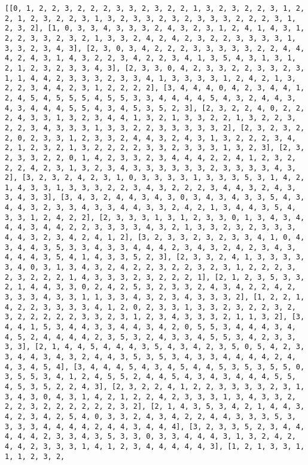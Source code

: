 \documentclass[11pt]{article}
\begin{document}
    \begin{Verbatim}[commandchars=\\\{\}]
[[0, 1, 2, 2, 3, 2, 2, 2, 3, 3, 2, 3, 2, 2, 1, 3, 2, 3, 2, 2, 3, 1, 2, 2, 1, 2, 3, 2, 2, 3, 1, 3, 2, 3, 3, 2, 3, 2, 3, 3, 3, 2, 2, 2, 3, 1, 2, 3, 2], [1, 0, 3, 3, 4, 3, 3, 3, 2, 4, 3, 2, 3, 1, 2, 4, 1, 4, 3, 1, 2, 2, 3, 3, 2, 3, 2, 1, 3, 3, 2, 4, 2, 4, 2, 3, 2, 2, 3, 3, 3, 3, 1, 3, 3, 2, 3, 4, 3], [2, 3, 0, 3, 4, 2, 2, 2, 3, 3, 3, 3, 3, 2, 2, 4, 4, 4, 2, 4, 3, 1, 4, 3, 2, 2, 3, 4, 2, 2, 3, 4, 1, 3, 5, 4, 3, 1, 3, 1, 2, 1, 2, 3, 2, 3, 3, 4, 3], [2, 3, 3, 0, 4, 2, 3, 3, 2, 2, 3, 3, 2, 3, 1, 1, 4, 4, 2, 3, 3, 3, 2, 3, 3, 4, 1, 3, 3, 3, 3, 1, 2, 4, 2, 1, 3, 2, 2, 3, 4, 4, 2, 3, 1, 2, 2, 2, 2], [3, 4, 4, 4, 0, 4, 2, 3, 4, 4, 1, 2, 4, 5, 4, 5, 5, 5, 4, 5, 5, 3, 3, 4, 4, 4, 4, 5, 4, 3, 2, 4, 4, 3, 4, 3, 4, 4, 4, 5, 5, 4, 3, 4, 5, 3, 5, 2, 3], [2, 3, 2, 2, 4, 0, 2, 2, 2, 4, 3, 3, 1, 3, 2, 3, 4, 4, 1, 3, 2, 1, 3, 3, 2, 2, 1, 3, 2, 2, 3, 2, 2, 3, 4, 3, 3, 3, 1, 3, 3, 2, 2, 3, 3, 3, 3, 3, 2], [2, 3, 2, 3, 2, 2, 0, 2, 3, 3, 1, 2, 3, 3, 2, 4, 4, 3, 2, 4, 3, 1, 3, 2, 2, 2, 3, 4, 2, 1, 2, 3, 2, 1, 3, 2, 2, 2, 2, 3, 3, 2, 3, 3, 3, 1, 3, 2, 3], [2, 3, 2, 3, 3, 2, 2, 0, 1, 4, 2, 3, 3, 2, 3, 4, 4, 4, 2, 2, 4, 1, 2, 3, 2, 2, 2, 4, 2, 3, 1, 3, 2, 3, 4, 3, 3, 3, 3, 3, 3, 2, 3, 3, 3, 3, 4, 3, 2], [3, 2, 3, 2, 4, 2, 3, 1, 0, 3, 3, 3, 3, 1, 3, 3, 3, 5, 3, 1, 4, 2, 1, 4, 3, 3, 1, 3, 3, 3, 2, 2, 3, 4, 3, 2, 2, 2, 3, 4, 4, 3, 2, 4, 3, 3, 4, 3, 3], [3, 4, 3, 2, 4, 4, 3, 4, 3, 0, 3, 4, 3, 4, 3, 3, 5, 4, 3, 4, 4, 3, 2, 3, 3, 4, 3, 3, 4, 4, 3, 3, 2, 4, 2, 1, 3, 4, 4, 3, 5, 4, 3, 3, 1, 2, 4, 2, 2], [2, 3, 3, 3, 1, 3, 1, 2, 3, 3, 0, 1, 3, 4, 3, 4, 4, 4, 3, 4, 4, 2, 2, 3, 3, 3, 3, 4, 3, 2, 1, 3, 3, 2, 3, 2, 3, 3, 3, 4, 4, 3, 2, 3, 4, 2, 4, 1, 2], [3, 2, 3, 3, 2, 3, 2, 3, 3, 4, 1, 0, 4, 3, 4, 4, 3, 5, 3, 3, 4, 3, 3, 4, 4, 4, 2, 3, 4, 3, 2, 4, 2, 3, 4, 3, 4, 4, 4, 3, 5, 4, 1, 4, 3, 3, 5, 2, 3], [2, 3, 3, 2, 4, 1, 3, 3, 3, 3, 3, 4, 0, 3, 1, 3, 4, 3, 2, 4, 2, 2, 3, 2, 2, 3, 2, 3, 1, 2, 2, 2, 3, 2, 3, 2, 2, 2, 1, 4, 3, 3, 3, 2, 3, 2, 2, 2, 1], [2, 1, 2, 3, 5, 3, 3, 2, 1, 4, 4, 3, 3, 0, 2, 4, 2, 5, 3, 2, 3, 3, 2, 4, 3, 4, 2, 2, 4, 2, 3, 3, 3, 4, 3, 3, 1, 1, 3, 3, 4, 3, 2, 3, 4, 3, 3, 3, 2], [1, 2, 2, 1, 4, 2, 2, 3, 3, 3, 3, 4, 1, 2, 0, 2, 3, 3, 1, 3, 3, 2, 3, 2, 2, 3, 2, 3, 2, 2, 2, 2, 2, 3, 3, 2, 3, 1, 2, 3, 4, 3, 3, 3, 2, 1, 1, 3, 2], [3, 4, 4, 1, 5, 3, 4, 4, 3, 3, 4, 4, 3, 4, 2, 0, 5, 5, 3, 4, 4, 4, 3, 4, 4, 5, 2, 4, 4, 4, 4, 2, 3, 5, 3, 2, 4, 3, 3, 4, 5, 5, 3, 4, 2, 3, 3, 3, 3], [2, 1, 4, 4, 5, 4, 4, 4, 3, 5, 4, 3, 4, 2, 3, 5, 0, 5, 4, 2, 3, 3, 4, 4, 3, 4, 3, 2, 4, 4, 3, 5, 3, 5, 3, 4, 3, 3, 4, 4, 4, 4, 2, 4, 4, 3, 4, 5, 4], [3, 4, 4, 4, 5, 4, 3, 4, 5, 4, 4, 5, 3, 5, 3, 5, 5, 0, 3, 5, 5, 3, 4, 1, 2, 4, 5, 5, 2, 4, 4, 5, 4, 3, 4, 3, 4, 4, 4, 5, 5, 4, 5, 3, 5, 2, 2, 4, 3], [2, 3, 2, 2, 4, 1, 2, 2, 3, 3, 3, 3, 2, 3, 1, 3, 4, 3, 0, 4, 3, 1, 4, 2, 1, 2, 2, 4, 2, 3, 3, 3, 1, 3, 4, 3, 3, 2, 2, 2, 3, 2, 2, 2, 2, 2, 2, 3, 2], [2, 1, 4, 3, 5, 3, 4, 2, 1, 4, 4, 3, 4, 2, 3, 4, 2, 5, 4, 0, 3, 3, 2, 4, 3, 4, 2, 2, 4, 4, 3, 3, 3, 5, 3, 3, 3, 3, 4, 4, 4, 4, 2, 4, 4, 3, 4, 4, 4], [3, 2, 3, 3, 5, 2, 3, 4, 4, 4, 4, 4, 2, 3, 3, 4, 3, 5, 3, 3, 0, 3, 3, 4, 4, 4, 3, 1, 3, 2, 4, 2, 4, 4, 2, 3, 3, 3, 1, 4, 1, 2, 3, 4, 4, 4, 4, 4, 3], [1, 2, 1, 3, 3, 1, 1, 1, 2, 3, 2, 
\end{Verbatim}
\end{document}
